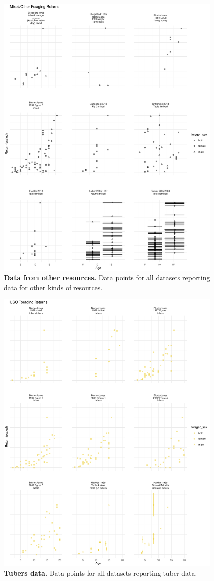 \begin{figure}[h]
\centering
\includegraphics[width=12cm] {text/images/Figure_S11.pdf}
\renewcommand{\thefigure}{S\arabic{figure}}
\caption{\textbf{Data from other resources.} Data points for all datasets reporting data for other kinds of resources.}
\label{fig:other}
\end{figure}

\begin{figure}[h]
\centering
\includegraphics[width=12cm] {text/images/Figure_S12.pdf}
\renewcommand{\thefigure}{S\arabic{figure}}
\caption{\textbf{Tubers data.} Data points for all datasets reporting tuber data.}
\label{fig:USO}
\end{figure}